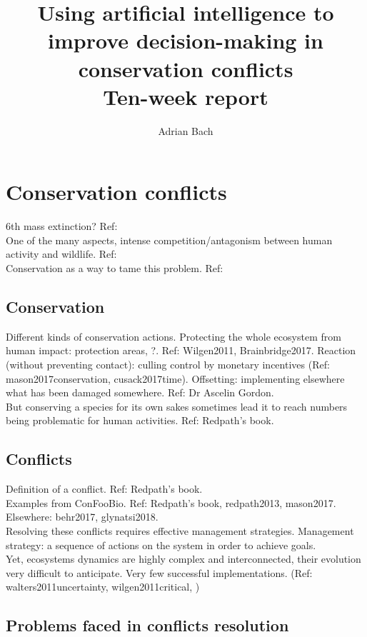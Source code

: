 \documentclass[12pt,a4paper]{article}
\author{Adrian Bach}
\title{Using artificial intelligence to improve decision-making in conservation conflicts \\\medskip Ten-week report}
\begin{document}
\maketitle

\tableofcontents

\newpage
\section{Conservation conflicts}

6th mass extinction? Ref: \\
One of the many aspects, intense competition/antagonism between human activity and wildlife. Ref: \\
Conservation as a way to tame this problem. Ref: \\

\subsection{Conservation}

Different kinds of conservation actions.
Protecting the whole ecosystem from human impact: protection areas, ?. Ref: Wilgen2011, Brainbridge2017.
Reaction (without preventing contact): culling control by monetary incentives (Ref: mason2017conservation, cusack2017time).
Offsetting: implementing elsewhere what has been damaged somewhere. Ref: Dr Ascelin Gordon.\\
But conserving a species for its own sakes sometimes lead it to reach numbers being problematic for human activities. Ref: Redpath's book.

\subsection{Conflicts}

Definition of a conflict. Ref: Redpath's book.\\
Examples from ConFooBio. Ref: Redpath's book, redpath2013, mason2017.
Elsewhere: behr2017, glynatsi2018.\\
Resolving these conflicts requires effective management strategies.
Management strategy: a sequence of actions on the system in order to achieve goals.\\
Yet, ecosystems dynamics are highly complex and interconnected, their evolution very difficult to anticipate.
Very few successful implementations. (Ref: walters2011uncertainty, wilgen2011critical, )

\subsection{Problems faced in conflicts resolution}
\end{document}
